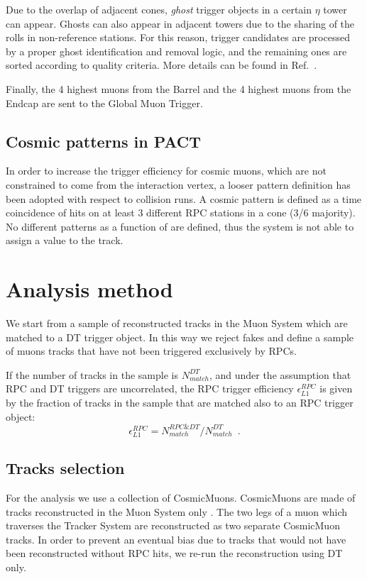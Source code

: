 Due to the overlap of adjacent cones, 
{\em ghost} trigger objects in a certain $\eta$ tower 
can appear. Ghosts can also appear in adjacent towers 
due to the sharing of the rolls in non-reference stations. 
For this reason, trigger candidates are processed by a proper 
ghost identification and removal logic,
and the remaining ones are sorted according to quality criteria.
More details can be found in Ref.~\cite{ref:trig_tdr}.

Finally, the 4 highest \pt muons
from the Barrel and the 4 highest \pt muons from the
Endcap are sent to the Global Muon Trigger.

\subsection{Cosmic patterns in PACT}
In order to increase the trigger efficiency for 
cosmic muons, which are not constrained
to come from the interaction vertex, 
a looser pattern definition has been 
adopted with respect to collision runs.
A cosmic pattern is defined as a 
time coincidence of hits on at least
3 different RPC stations in a cone (3/6 majority).
No different patterns as a function 
of \pt are defined, thus the system is
not able to assign a \pt value 
to the track.

\section{Analysis method}
We start from a sample of reconstructed tracks 
in the Muon System which are matched to a DT 
trigger object. In this way we reject fakes 
and define a sample of muons tracks that have not been 
triggered exclusively by RPCs.

If the number of tracks in the sample is 
$N_{match}^{DT}$, and under the assumption
that RPC and DT triggers are uncorrelated,
the RPC trigger efficiency 
$\epsilon_{L1}^{RPC}$ is given by the fraction 
of tracks in the sample that are matched also 
to an RPC trigger object:
\begin{equation}
\epsilon_{L1}^{RPC} = N_{match}^{RPC\&DT}/N_{match}^{DT} \,\,\,.
\end{equation}

\subsection{Tracks selection}
For the analysis we use a collection of CosmicMuons.
CosmicMuons are made of tracks reconstructed in the
Muon System only .
The two legs of a muon which traverses
the Tracker System are reconstructed as two separate 
CosmicMuon tracks.
In order to prevent an eventual bias due to tracks 
that would not have been reconstructed without
RPC hits, we re-run the reconstruction using DT only.

